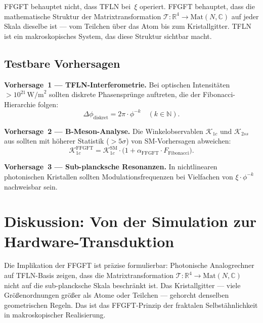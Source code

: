 \begin{keybox}
FFGFT behauptet nicht, dass TFLN bei~$\xi$ operiert. FFGFT behauptet,
dass die mathematische Struktur der Matrixtransformation
$\mathcal{T}: \mathbb{R}^4 \to \mathrm{Mat}(N,\mathbb{C})$
auf jeder Skala dieselbe ist — vom Teilchen über das Atom bis
zum Kristallgitter. TFLN ist ein makroskopisches System, das diese
Struktur sichtbar macht.
\end{keybox}

\subsection{Testbare Vorhersagen}

\begin{predbox}
\textbf{Vorhersage~1 — TFLN-Interferometrie.}
Bei optischen Intensitäten $> 10^{21}\,\text{W/m}^2$ sollten diskrete
Phasensprünge auftreten, die der Fibonacci-Hierarchie folgen:
\[
  \Delta\phi_{\text{diskret}} = 2\pi \cdot \phi^{-k} \quad (k \in \mathbb{N}).
\]
\end{predbox}

\begin{predbox}
\textbf{Vorhersage~2 — B-Meson-Analyse.}
Die Winkelobservablen $\mathcal{K}_{1c}$ und $\mathcal{K}_{2ss}$ aus
\cite{Arslan2026} sollten mit höherer Statistik ($> 5\sigma$) von
SM-Vorhersagen abweichen:
\[
  \mathcal{K}_{1c}^{\text{FFGFT}}
  = \mathcal{K}_{1c}^{\text{SM}}
    \cdot \bigl(1 + \alpha_{\text{FFGFT}} \cdot F_{\text{Fibonacci}}\bigr).
\]
\end{predbox}

\begin{predbox}
\textbf{Vorhersage~3 — Sub-plancksche Resonanzen.}
In nichtlinearen photonischen Kristallen sollten Modulationsfrequenzen
bei Vielfachen von $\xi\cdot\phi^{-k}$ nachweisbar sein.
\end{predbox}

\section{Diskussion: Von der Simulation zur Hardware-Transduktion}

Die Implikation der FFGFT ist präzise formulierbar: Photonische Analogrechner
auf TFLN-Basis zeigen, dass die Matrixtransformation
$\mathcal{T}: \mathbb{R}^4 \to \mathrm{Mat}(N,\mathbb{C})$
nicht auf die sub-plancksche Skala beschränkt ist. Das Kristallgitter
— viele Größenordnungen größer als Atome oder Teilchen — gehorcht
denselben geometrischen Regeln. Das ist das FFGFT-Prinzip der
fraktalen Selbstähnlichkeit in makroskopischer Realisierung.

